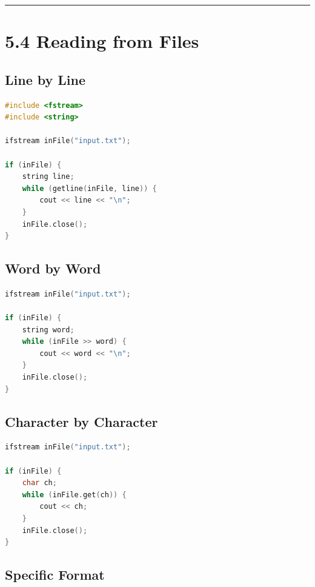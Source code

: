 \begin{center}\rule{0.5\linewidth}{0.5pt}\end{center}

\hypertarget{reading-from-files}{%
\section{5.4 Reading from Files}\label{reading-from-files}}

\hypertarget{line-by-line}{%
\subsection{Line by Line}\label{line-by-line}}

\begin{lstlisting}[language={C++}]
#include <fstream>
#include <string>

ifstream inFile("input.txt");

if (inFile) {
    string line;
    while (getline(inFile, line)) {
        cout << line << "\n";
    }
    inFile.close();
}
\end{lstlisting}

\hypertarget{word-by-word}{%
\subsection{Word by Word}\label{word-by-word}}

\begin{lstlisting}[language={C++}]
ifstream inFile("input.txt");

if (inFile) {
    string word;
    while (inFile >> word) {
        cout << word << "\n";
    }
    inFile.close();
}
\end{lstlisting}

\hypertarget{character-by-character}{%
\subsection{Character by Character}\label{character-by-character}}

\begin{lstlisting}[language={C++}]
ifstream inFile("input.txt");

if (inFile) {
    char ch;
    while (inFile.get(ch)) {
        cout << ch;
    }
    inFile.close();
}
\end{lstlisting}

\hypertarget{specific-format}{%
\subsection{Specific Format}\label{specific-format}}

